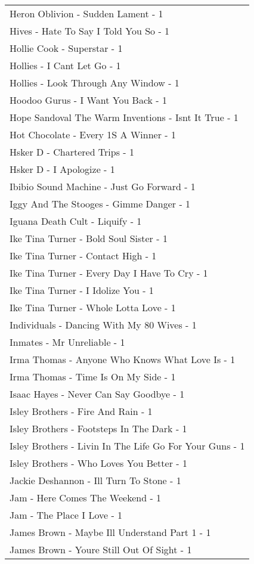 \documentclass[
]{article}
\begin{document}
\begin{longtable}{l}
Heron Oblivion - Sudden Lament - 1 \\ 
Hives - Hate To Say I Told You So - 1 \\ 
Hollie Cook - Superstar - 1 \\ 
Hollies - I Cant Let Go - 1 \\ 
Hollies - Look Through Any Window - 1 \\ 
Hoodoo Gurus - I Want You Back - 1 \\ 
Hope Sandoval The Warm Inventions - Isnt It True - 1 \\ 
Hot Chocolate - Every 1S A Winner - 1 \\ 
Hsker D - Chartered Trips - 1 \\ 
Hsker D - I Apologize - 1 \\ 
Ibibio Sound Machine - Just Go Forward - 1 \\ 
Iggy And The Stooges - Gimme Danger - 1 \\ 
Iguana Death Cult - Liquify - 1 \\ 
Ike Tina Turner - Bold Soul Sister - 1 \\ 
Ike Tina Turner - Contact High - 1 \\ 
Ike Tina Turner - Every Day I Have To Cry - 1 \\ 
Ike Tina Turner - I Idolize You - 1 \\ 
Ike Tina Turner - Whole Lotta Love - 1 \\ 
Individuals - Dancing With My 80 Wives - 1 \\ 
Inmates - Mr Unreliable - 1 \\ 
Irma Thomas - Anyone Who Knows What Love Is - 1 \\ 
Irma Thomas - Time Is On My Side - 1 \\ 
Isaac Hayes - Never Can Say Goodbye - 1 \\ 
Isley Brothers - Fire And Rain - 1 \\ 
Isley Brothers - Footsteps In The Dark - 1 \\ 
Isley Brothers - Livin In The Life Go For Your Guns - 1 \\ 
Isley Brothers - Who Loves You Better - 1 \\ 
Jackie Deshannon - Ill Turn To Stone - 1 \\ 
Jam - Here Comes The Weekend - 1 \\ 
Jam - The Place I Love - 1 \\ 
James Brown - Maybe Ill Understand Part 1 - 1 \\ 
James Brown - Youre Still Out Of Sight - 1 \\ 

\end{longtable}
\end{document}
